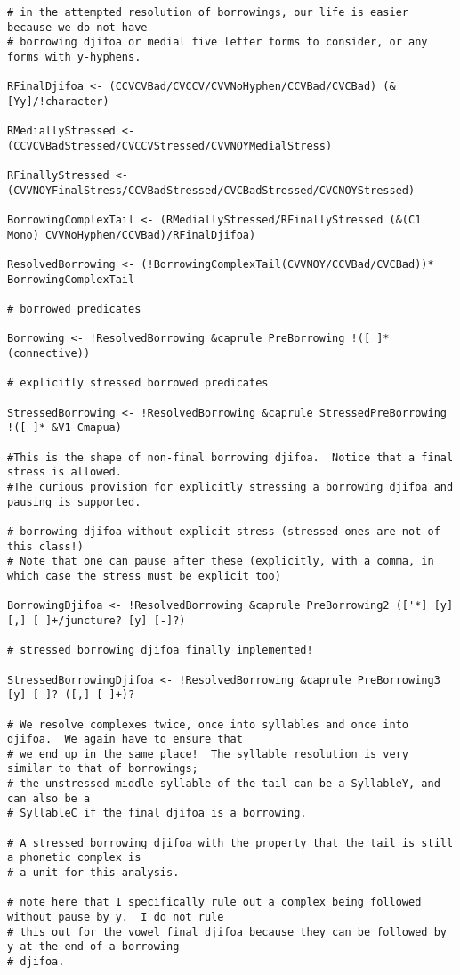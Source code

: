 \documentclass{article}
\begin{document}
\begin{verbatim}
# in the attempted resolution of borrowings, our life is easier because we do not have
# borrowing djifoa or medial five letter forms to consider, or any forms with y-hyphens.

RFinalDjifoa <- (CCVCVBad/CVCCV/CVVNoHyphen/CCVBad/CVCBad) (&[Yy]/!character)

RMediallyStressed <- (CCVCVBadStressed/CVCCVStressed/CVVNOYMedialStress)

RFinallyStressed <- (CVVNOYFinalStress/CCVBadStressed/CVCBadStressed/CVCNOYStressed)

BorrowingComplexTail <- (RMediallyStressed/RFinallyStressed (&(C1 Mono) CVVNoHyphen/CCVBad)/RFinalDjifoa)

ResolvedBorrowing <- (!BorrowingComplexTail(CVVNOY/CCVBad/CVCBad))* BorrowingComplexTail

# borrowed predicates

Borrowing <- !ResolvedBorrowing &caprule PreBorrowing !([ ]* (connective))

# explicitly stressed borrowed predicates

StressedBorrowing <- !ResolvedBorrowing &caprule StressedPreBorrowing !([ ]* &V1 Cmapua)

#This is the shape of non-final borrowing djifoa.  Notice that a final stress is allowed.
#The curious provision for explicitly stressing a borrowing djifoa and pausing is supported.

# borrowing djifoa without explicit stress (stressed ones are not of this class!)
# Note that one can pause after these (explicitly, with a comma, in which case the stress must be explicit too)

BorrowingDjifoa <- !ResolvedBorrowing &caprule PreBorrowing2 (['*] [y] [,] [ ]+/juncture? [y] [-]?)

# stressed borrowing djifoa finally implemented!

StressedBorrowingDjifoa <- !ResolvedBorrowing &caprule PreBorrowing3 [y] [-]? ([,] [ ]+)?

# We resolve complexes twice, once into syllables and once into djifoa.  We again have to ensure that
# we end up in the same place!  The syllable resolution is very similar to that of borrowings;
# the unstressed middle syllable of the tail can be a SyllableY, and can also be a
# SyllableC if the final djifoa is a borrowing.

# A stressed borrowing djifoa with the property that the tail is still a phonetic complex is
# a unit for this analysis.

# note here that I specifically rule out a complex being followed without pause by y.  I do not rule
# this out for the vowel final djifoa because they can be followed by y at the end of a borrowing
# djifoa.


\end{verbatim}
\end{document}
